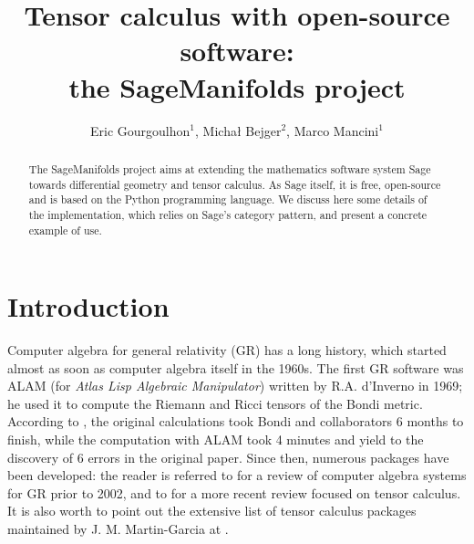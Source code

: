 \documentclass[a4paper]{jpconf}
\newcommand{\soft}[1]{\textsf{#1}}
\newcommand{\Sage}{\soft{Sage}}
\newcommand{\SM}{\soft{SageManifolds}}
\begin{document}
\title{Tensor calculus with open-source software: \\
the SageManifolds project}

\author{Eric Gourgoulhon$^1$, Micha\l{} Bejger$^2$, Marco Mancini$^1$}

\address{$^1$ Laboratoire Univers et Th\'eories, UMR 8102 du 
CNRS, Observatoire de Paris, Universit\'e Paris Diderot,
92190 Meudon, France}

\address{$^2$ Centrum Astronomiczne im. M. Kopernika, ul. Bartycka 18,
00-716 Warsaw, Poland}


\begin{abstract}
The \SM{} project aims at extending the mathematics software system \Sage{} towards
differential geometry and tensor calculus. As \Sage{} itself, it is free,
open-source and is based on the Python programming language.
We discuss here some details of the implementation, which relies 
on \Sage{}'s category pattern, and present a concrete example of use.
\end{abstract}


\section{Introduction}

Computer algebra for general relativity (GR) has a long history, which started
almost as soon as computer algebra itself in the 1960s. 
The first GR software was \soft{ALAM} (for \emph{Atlas Lisp Algebraic Manipulator})
written by R.A. d'Inverno in 1969; he used it to compute
the Riemann and Ricci tensors of the Bondi metric.
According to \cite{Skea94}, 
the original calculations took Bondi and collaborators 6 months to finish,
while the computation with \soft{ALAM} took 4 minutes and yield to the 
discovery of 6 errors in the original paper. 
Since then, numerous packages have been developed: the reader is referred to \cite{MacCa02}
for a review of computer algebra
systems for GR prior to 2002, and to \cite{KorolKS13} for a more recent review 
focused on tensor calculus. 
It is also worth to point out the extensive list of
tensor calculus packages maintained by J. M. Martin-Garcia at \cite{xact_links}.
\end{document}
